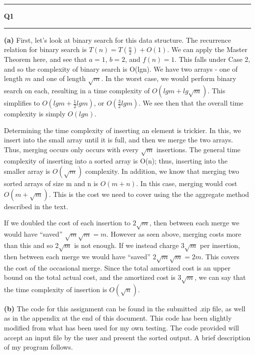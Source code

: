 \documentclass[11pt]{article}
\newcommand\question[2]{\vspace{.25in}\hrule\textbf{#1 #2}\vspace{.5em}\hrule\vspace{.10in}}
\renewcommand\part[1]{\vspace{.10in}\textbf{(#1)}}
\begin{document}
\raggedright
\newcommand\NAME{Sean Connor (443-414-5111)}  %
\newcommand\HWNUM{ PA1}              %

\question{Q1}{}
\part{a} First, let's look at binary search for this data structure. The recurrence relation for binary search is $T(n) = T(\frac{n}{2}) + O(1)$. We can apply the Master Theorem here, and see that $a=1$, $b=2$, and $f(n)=1$. This falls under Case 2, and so the complexity of binary search is O(lgn). We have two arrays - one of length $m$ and one of length $\sqrt{m}$. In the worst case, we would perform binary search on each, resulting in a time complexity of $O(lgm+lg\sqrt{m})$. This simplifies to $O(lgm + \frac{1}{2}lgm)$, or $O(\frac{3}{2}lgm)$. We see then that the overall time complexity is simply $O(lgn)$.

Determining the time complexity of inserting an element is trickier. In this, we insert into the small array until it is full, and then we merge the two arrays. Thus, merging occurs only occurs with every $\sqrt{m}$ insertions. The general time complexity of inserting into a sorted array is O(n); thus, inserting into the smaller array is $O(\sqrt{m})$ complexity. In addition, we know that merging two sorted arrays of size m and n is $O(m+n)$. In this case, merging would cost $O(m+\sqrt{m})$. This is the cost we need to cover using the the aggregate method described in the text. 

If we doubled the cost of each insertion to $2\sqrt{m}$, then between each merge we would have ``saved'' $\sqrt{m}\sqrt{m} = m$. However as seen above, merging costs more than this and so $2\sqrt{m}$ is not enough. If we instead charge $3\sqrt{m}$ per insertion, then between each merge we would have ``saved'' $2\sqrt{m}\sqrt{m} = 2m$. This covers the cost of the occasional merge. Since the total amortized cost is an upper bound on the total actual cost, and the amortized cost is $3\sqrt{m}$, we can say that the time complexity of insertion is $O(\sqrt{n})$.

\part{b} The code for this assignment can be found in the submitted .zip file, as well as in the appendix at the end of this document. This code has been slightly modified from what has been used for my own testing. The code provided will accept an input file by the user and present the sorted output. A brief description of my program follows. 
\end{document}

